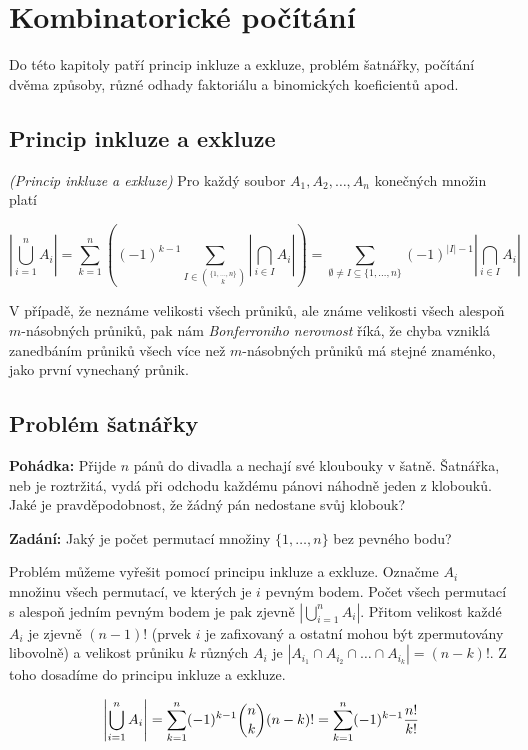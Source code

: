 \section{Kombinatorické počítání}
Do této kapitoly patří princip inkluze a exkluze, problém šatnářky, počítání dvěma
způsoby, různé odhady faktoriálu a binomických koeficientů apod.

\subsection{Princip inkluze a exkluze}

\vt \emph{(Princip inkluze a exkluze)} Pro každý soubor $A_1,A_2,\dots,A_n$
konečných množin platí

$$\left|\bigcup_{i=1}^n A_i\right|
= \sum_{k=1}^n \left( (-1)^{k-1} \sum_{I\in{\{1,\dots,n\}\choose k}} \left|\bigcap_{i\in I} A_i\right| \right)
= \sum_{\emptyset\neq I\subseteq \{1,\dots,n\}} (-1)^{|I|-1}\left|\bigcap_{i\in I}A_i\right|$$

V případě, že neznáme velikosti všech průniků, ale známe velikosti všech alespoň
$m$-násobných průniků, pak nám \emph{Bonferroniho nerovnost} říká, že chyba
vzniklá zanedbáním průniků všech více než $m$-násobných průniků má stejné
znaménko, jako první vynechaný průnik.

\subsection{Problém šatnářky}

\noindent\textbf{Pohádka:} Přijde $n$ pánů do divadla a nechají své kloubouky v
šatně. Šatnářka, neb je roztržitá, vydá při odchodu každému pánovi náhodně
jeden z klobouků. Jaké je pravděpodobnost, že žádný pán nedostane svůj klobouk?

\smallskip
\noindent\textbf{Zadání:} Jaký je počet permutací množiny $\{1,\dots,n\}$ bez
pevného bodu?

Problém můžeme vyřešit pomocí principu inkluze a exkluze. Označme $A_i$ množinu
všech permutací, ve kterých je $i$ pevným bodem. Počet všech permutací s alespoň
jedním pevným bodem je pak zjevně $\left|\bigcup_{i=1}^n A_i\right|$. Přitom
velikost každé $A_i$ je zjevně $(n-1)!$ (prvek $i$ je zafixovaný a ostatní mohou
být zpermutovány libovolně) a velikost průniku $k$ různých $A_i$ je $|A_{i_1}
\cap A_{i_2} \cap \dots \cap A_{i_k}| = (n-k)!$. Z toho dosadíme do principu
inkluze a exkluze.

$$\left|\bigcup_{i=1}^n A_i\right| = \sum_{k=1}^n (-1)^{k-1}{n\choose k}(n-k)! =
\sum_{k=1}^n (-1)^{k-1}{n!\over k!}$$

